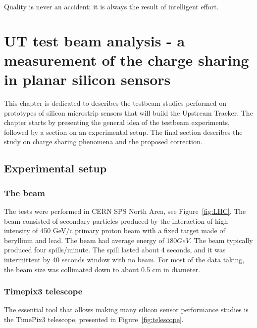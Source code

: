 \begin{savequote}[75mm] 
Quality is never an accident; it is always the result of intelligent effort. 
\end{savequote}


\chapter{UT test beam analysis - a measurement of the charge sharing
in planar silicon sensors}
\label{chapter:testbeam}

This chapter is dedicated to describes the testbeam studies performed on prototypes of silicon microstrip sensors that will build the Upstream Tracker.  The chapter starts by presenting the general idea of the testbeam experiments, followed by a section on an experimental setup. The final section describes the study on charge sharing phenomena and the proposed correction. 

\section{Experimental setup}

\subsection{The beam}
The tests were performed in CERN SPS North Area, see Figure~\ref{fig:LHC}. The beam consisted of secondary particles produced by the interaction of high intensity of 450 GeV/c primary proton beam with a fixed target made of beryllium and lead. The beam had average energy of $180 GeV$.  
The beam typically produced four spills/minute. The spill lasted about 4 seconds, and it was intermittent by 40 seconds window with no beam. For most of the data taking, the beam size was collimated down to about 0.5 cm in diameter.

\subsection{Timepix3 telescope}
The essential tool that allows making many silicon sensor performance studies is the TimePix3 telescope, presented in Figure~\ref{fig:telescope}. 


